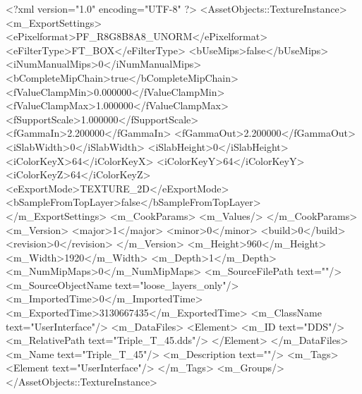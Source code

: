 <?xml version="1.0" encoding="UTF-8" ?>
<AssetObjects::TextureInstance>
	<m_ExportSettings>
		<ePixelformat>PF_R8G8B8A8_UNORM</ePixelformat>
		<eFilterType>FT_BOX</eFilterType>
		<bUseMips>false</bUseMips>
		<iNumManualMips>0</iNumManualMips>
		<bCompleteMipChain>true</bCompleteMipChain>
		<fValueClampMin>0.000000</fValueClampMin>
		<fValueClampMax>1.000000</fValueClampMax>
		<fSupportScale>1.000000</fSupportScale>
		<fGammaIn>2.200000</fGammaIn>
		<fGammaOut>2.200000</fGammaOut>
		<iSlabWidth>0</iSlabWidth>
		<iSlabHeight>0</iSlabHeight>
		<iColorKeyX>64</iColorKeyX>
		<iColorKeyY>64</iColorKeyY>
		<iColorKeyZ>64</iColorKeyZ>
		<eExportMode>TEXTURE_2D</eExportMode>
		<bSampleFromTopLayer>false</bSampleFromTopLayer>
	</m_ExportSettings>
	<m_CookParams>
		<m_Values/>
	</m_CookParams>
	<m_Version>
		<major>1</major>
		<minor>0</minor>
		<build>0</build>
		<revision>0</revision>
	</m_Version>
	<m_Height>960</m_Height>
	<m_Width>1920</m_Width>
	<m_Depth>1</m_Depth>
	<m_NumMipMaps>0</m_NumMipMaps>
	<m_SourceFilePath text=""/>
	<m_SourceObjectName text="loose_layers_only"/>
	<m_ImportedTime>0</m_ImportedTime>
	<m_ExportedTime>3130667435</m_ExportedTime>
	<m_ClassName text="UserInterface"/>
	<m_DataFiles>
		<Element>
			<m_ID text="DDS"/>
			<m_RelativePath text="Triple_T_45.dds"/>
		</Element>
	</m_DataFiles>
	<m_Name text="Triple_T_45"/>
	<m_Description text=""/>
	<m_Tags>
		<Element text="UserInterface"/>
	</m_Tags>
	<m_Groups/>
</AssetObjects::TextureInstance>


